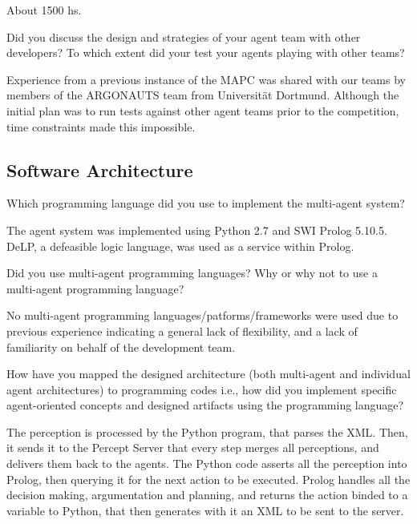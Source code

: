 \begin{question}
\begin{question}
About 1500 hs.

\begin{question}
Did you discuss the design and strategies of your agent team with other
developers? To which extent did your test your agents playing with other
teams?  
\end{question}

Experience from a previous instance of the MAPC was shared with our
teams by members of the ARGONAUTS team from Universität Dortmund. Although the
initial plan was to run tests against other agent teams prior to the
competition, time constraints made this impossible.

\subsection{Software Architecture}

\begin{question}
Which programming language did you use to
implement the multi-agent system?  
\end{question}
The agent system was implemented using
Python 2.7 and SWI Prolog 5.10.5. DeLP, a defeasible logic language, was used
as a service within Prolog.

\begin{question}
Did you use multi-agent programming languages? Why or why not to use a
multi-agent programming language?  
\end{question}

No multi-agent programming
languages/patforms/frameworks were used due to previous experience indicating
a general lack of flexibility, and a lack of familiarity on behalf of the
development team.

\begin{question}
How have you mapped the designed architecture (both multi-agent and
individual agent architectures) to programming codes i.e., how did you
implement specific agent-oriented concepts and designed artifacts using the
programming language?  
\end{question}

The perception is processed by the Python program, that
parses the XML. Then, it sends it to the Percept Server that every step merges
all perceptions, and delivers them back to the agents.  The Python code
asserts all the perception into Prolog, then querying it for the next action
to be executed.  Prolog handles all the decision making, argumentation and
planning, and returns the action binded to a variable to Python, that then
generates with it an XML to be sent to the server.


\end{question}
\end{question}
